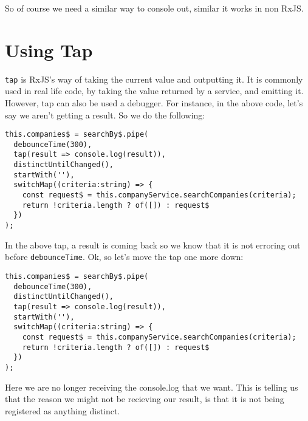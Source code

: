 So of course we need a similar way to console out, similar it works in non RxJS. 

\section{Using Tap}
\lstinline{tap} is RxJS's way of taking the current value and outputting it. It is commonly used in real life code, by taking the value returned by a service, and emitting it. However, tap can also be used a debugger. For instance, in the above code, let's say we aren't getting a result. So we do the following: 
\begin{lstlisting}
this.companies$ = searchBy$.pipe(
  debounceTime(300),
  tap(result => console.log(result)),
  distinctUntilChanged(),
  startWith(''),
  switchMap((criteria:string) => {
    const request$ = this.companyService.searchCompanies(criteria);
    return !criteria.length ? of([]) : request$
  })
);  
\end{lstlisting}

In the above tap, a result is coming back so we know that it is not erroring out before \lstinline{debounceTime}. Ok, so let's move the tap one more down: 
\begin{lstlisting}
this.companies$ = searchBy$.pipe(
  debounceTime(300),
  distinctUntilChanged(),
  tap(result => console.log(result)),
  startWith(''),
  switchMap((criteria:string) => {
    const request$ = this.companyService.searchCompanies(criteria);
    return !criteria.length ? of([]) : request$
  })
);  
\end{lstlisting}

Here we are no longer receiving the console.log that we want. This is telling us that the reason we might not be recieving our result, is that it is not being registered as anything distinct.